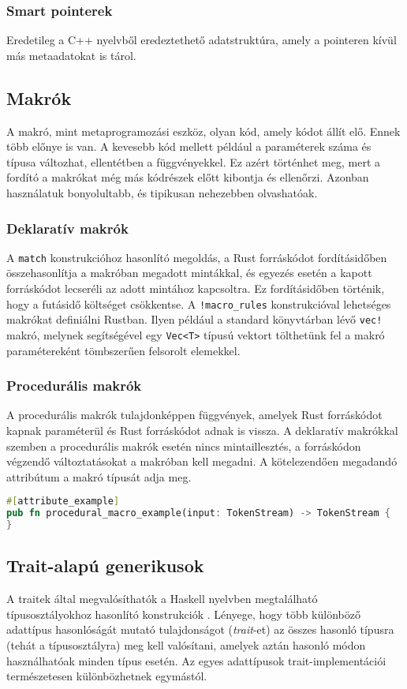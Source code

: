 \subsubsection{Smart pointerek}
Eredetileg a C++ nyelvből eredeztethető adatstruktúra, amely a pointeren kívül más metaadatokat is tárol.

\subsection{Makrók}
A makró, mint metaprogramozási eszköz, olyan kód, amely kódot állít elő. Ennek több előnye is van. A kevesebb kód mellett például a paraméterek száma és típusa változhat, ellentétben a függvényekkel. Ez azért történhet meg, mert a fordító a makrókat még más kódrészek előtt kibontja és ellenőrzi. Azonban használatuk bonyolultabb, és tipikusan nehezebben olvashatóak.

\subsubsection{Deklaratív makrók}
A \lstinline{match} konstrukcióhoz hasonlító megoldás, a Rust forráskódot fordításidőben összehasonlítja a makróban megadott mintákkal, és egyezés esetén a kapott forráskódot lecseréli az adott mintához kapcsoltra. Ez fordításidőben történik, hogy a futásidő költséget csökkentse. A \lstinline{!macro_rules} konstrukcióval lehetséges makrókat definiálni Rustban. Ilyen például a standard könyvtárban lévő \lstinline{vec!} makró, melynek segítségével egy \lstinline{Vec<T>} típusú vektort tölthetünk fel a makró paramétereként tömbszerűen felsorolt elemekkel.

\subsubsection{Procedurális makrók}
A procedurális makrók tulajdonképpen függvények, amelyek Rust forráskódot kapnak paraméterül és Rust forráskódot adnak is vissza. A deklaratív makrókkal szemben a procedurális makrók esetén nincs mintaillesztés, a forráskódon végzendő változtatásokat a makróban kell megadni. A kötelezendően megadandó attribútum a makró típusát adja meg.
\begin{lstlisting}[language=Rust, style=boxed]
#[attribute_example]
pub fn procedural_macro_example(input: TokenStream) -> TokenStream {
}
\end{lstlisting}

\subsection{Trait-alapú generikusok}
A traitek által megvalósíthatók a Haskell nyelvben megtalálható típusosztályokhoz hasonlító konstrukciók \cite{haskellorg}. Lényege, hogy több különböző adattípus hasonlóságát mutató tulajdonságot (\textit{trait}-et) az összes hasonló típusra (tehát a típusosztályra) meg kell valósítani, amelyek aztán hasonló módon használhatóak minden típus esetén. Az egyes adattípusok trait-implementációi természetesen különbözhetnek egymástól.

